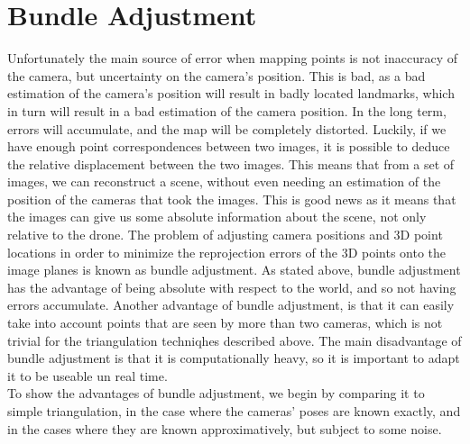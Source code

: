 \section{Bundle Adjustment}
Unfortunately the main source of error when mapping points is not inaccuracy of the camera, but uncertainty on the camera's position. This is bad, as a bad estimation of the camera's position will result in badly located landmarks, which in turn will result in a bad estimation of the camera position. In the long term, errors will accumulate, and the map will be completely distorted. Luckily, if we have enough point correspondences between two images, it is possible to deduce the relative displacement between the two images. This means that from a set of images, we can reconstruct a scene, without even needing an estimation of the position of the cameras that took the images. This is good news as it means that the images can give us some absolute information about the scene, not only relative to the drone. The problem of adjusting camera positions and 3D point locations in order to minimize the reprojection errors of the 3D points onto the image planes is known as bundle adjustment. As stated above, bundle adjustment has the advantage of being absolute with respect to the world, and so not having errors accumulate. Another advantage of bundle adjustment, is that it can easily take into account points that are seen by more than two cameras, which is not trivial for the triangulation techniqhes described above. The main disadvantage of bundle adjustment is that it is computationally heavy, so it is important to adapt it to be useable un real time.\\
To show the advantages of bundle adjustment, we begin by comparing it to simple triangulation, in the case where the cameras' poses are known exactly, and in the cases where they are known approximatively, but subject to some noise.

